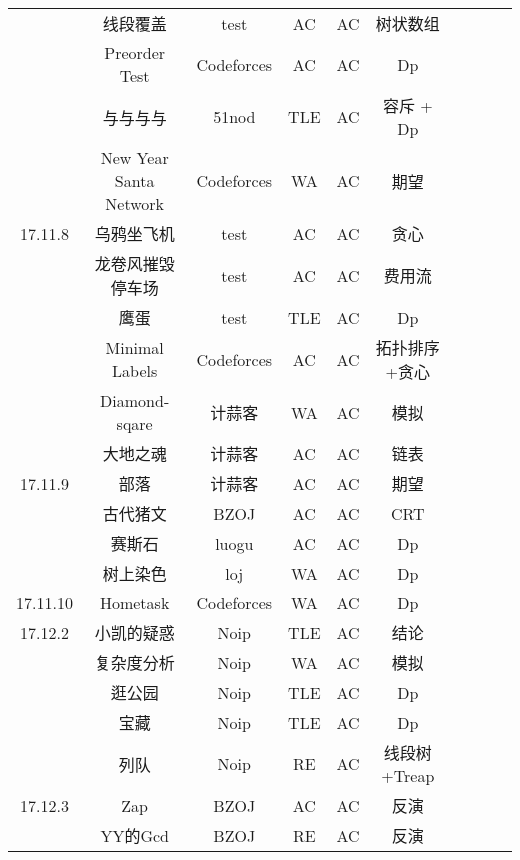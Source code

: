 \documentclass[landscape]{article}
\begin{document}
\begin{longtable}{cccccccccc}
  & 线段覆盖 & test & AC & AC & 树状数组\\
  & Preorder Test & Codeforces &  AC & AC & Dp\\
  & 与与与与 & 51nod & TLE & AC & 容斥 + Dp\\
  & New Year Santa Network & Codeforces & WA & AC & 期望\\
  \hline
  17.11.8 & 乌鸦坐飞机 & test & AC & AC & 贪心\\
  & 龙卷风摧毁停车场 & test & AC & AC & 费用流\\
  & 鹰蛋 & test & TLE & AC & Dp\\
  & Minimal Labels & Codeforces & AC & AC & 拓扑排序+贪心\\
  & Diamond-sqare & 计蒜客 & WA & AC & 模拟\\
  & 大地之魂 & 计蒜客 & AC & AC & 链表\\
  \hline
  17.11.9 & 部落 & 计蒜客 & AC & AC & 期望\\
  & 古代猪文 & BZOJ & AC & AC & CRT\\
  & 赛斯石 & luogu & AC & AC & Dp\\
  & 树上染色 & loj & WA & AC & Dp\\
  \hline
  17.11.10 & Hometask & Codeforces & WA & AC & Dp\\
  \hline
  17.12.2 & 小凯的疑惑 & Noip & TLE & AC & 结论\\
  & 复杂度分析 & Noip & WA &AC & 模拟\\
  & 逛公园 & Noip & TLE & AC & Dp\\
  & 宝藏 & Noip & TLE & AC & Dp\\
  & 列队 & Noip & RE & AC & 线段树+Treap\\
  \hline
  17.12.3 & Zap & BZOJ & AC & AC & 反演\\
  & YY的Gcd & BZOJ & RE & AC & 反演\\
\end{longtable}
\end{document}
